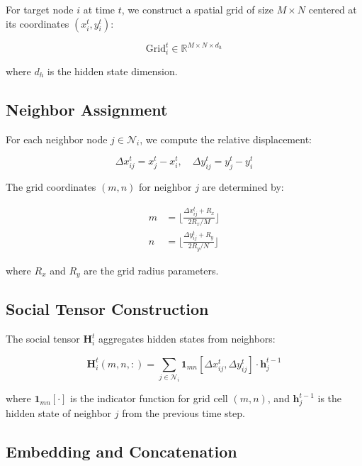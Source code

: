 \documentclass[11pt,a4paper]{article}
\begin{document}
For target node $i$ at time $t$, we construct a spatial grid of size $M \times N$ centered at its coordinates $(x_i^t, y_i^t)$:

\begin{equation}
\text{Grid}_{i}^t \in \mathbb{R}^{M \times N \times d_h}
\end{equation}

where $d_h$ is the hidden state dimension.

\subsection{Neighbor Assignment}

For each neighbor node $j \in \mathcal{N}_i$, we compute the relative displacement:

\begin{equation}
\Delta x_{ij}^t = x_j^t - x_i^t, \quad \Delta y_{ij}^t = y_j^t - y_i^t
\end{equation}

The grid coordinates $(m, n)$ for neighbor $j$ are determined by:

\begin{align}
m &= \lfloor \frac{\Delta x_{ij}^t + R_x}{2R_x / M} \rfloor \\
n &= \lfloor \frac{\Delta y_{ij}^t + R_y}{2R_y / N} \rfloor
\end{align}

where $R_x$ and $R_y$ are the grid radius parameters.

\subsection{Social Tensor Construction}

The social tensor $\mathbf{H}_i^t$ aggregates hidden states from neighbors:

\begin{equation}
\mathbf{H}_i^t(m, n, :) = \sum_{j \in \mathcal{N}_i} \mathbf{1}_{mn}[\Delta x_{ij}^t, \Delta y_{ij}^t] \cdot \mathbf{h}_j^{t-1}
\end{equation}

where $\mathbf{1}_{mn}[\cdot]$ is the indicator function for grid cell $(m,n)$, and $\mathbf{h}_j^{t-1}$ is the hidden state of neighbor $j$ from the previous time step.

\subsection{Embedding and Concatenation}
\end{document}
